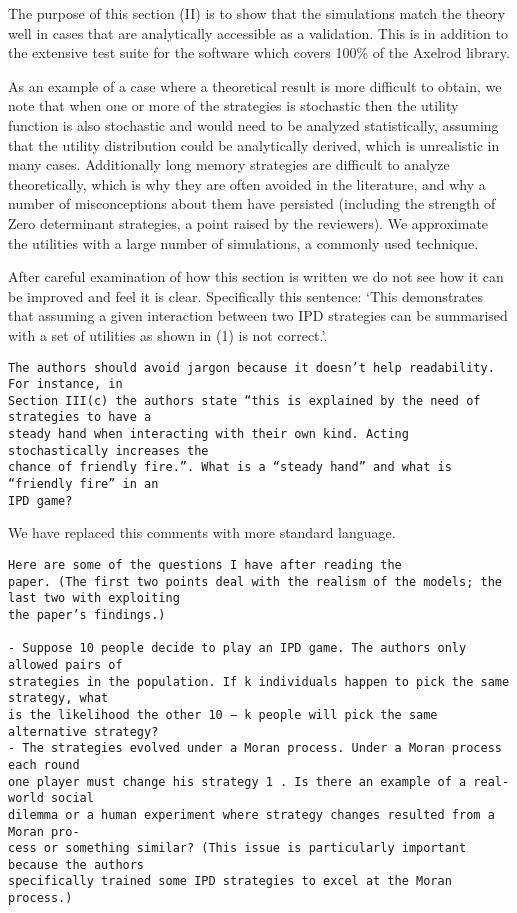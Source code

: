 \documentclass[a4]{article}
\begin{document}
The purpose of this section (II) is to show that the simulations match the
theory well in cases that are analytically accessible as a validation. This is
in addition to the extensive test suite for the software which covers 100\% of
the Axelrod library.

As an example of a case where a theoretical result is more difficult to obtain,
we note that when one or more of the strategies is stochastic then the utility
function is also stochastic and would need to be analyzed statistically,
assuming that the utility distribution could be analytically derived, which is
unrealistic in many cases. Additionally long memory strategies are difficult to
analyze theoretically, which is why they are often avoided in the literature,
and why a number of misconceptions about them have persisted (including the
strength of Zero determinant strategies, a point raised by the reviewers). 
We approximate
the utilities with a large number of simulations, a commonly used technique.

After careful examination of how this section is written we do not see how it
can be improved and feel it is clear. Specifically this sentence: `This
demonstrates that assuming a given interaction between two
IPD strategies can be summarised with a set of utilities as
shown in (1) is not correct.'.

\begin{verbatim}
The authors should avoid jargon because it doesn’t help readability. For instance, in
Section III(c) the authors state “this is explained by the need of strategies to have a
steady hand when interacting with their own kind. Acting stochastically increases the
chance of friendly fire.”. What is a “steady hand” and what is “friendly fire” in an
IPD game?
\end{verbatim}

We have replaced this comments with more standard language.

\begin{verbatim}
Here are some of the questions I have after reading the
paper. (The first two points deal with the realism of the models; the last two with exploiting
the paper’s findings.)

- Suppose 10 people decide to play an IPD game. The authors only allowed pairs of
strategies in the population. If k individuals happen to pick the same strategy, what
is the likelihood the other 10 − k people will pick the same alternative strategy?
- The strategies evolved under a Moran process. Under a Moran process each round
one player must change his strategy 1 . Is there an example of a real-world social
dilemma or a human experiment where strategy changes resulted from a Moran pro-
cess or something similar? (This issue is particularly important because the authors
specifically trained some IPD strategies to excel at the Moran process.)
\end{verbatim}
\end{document}
